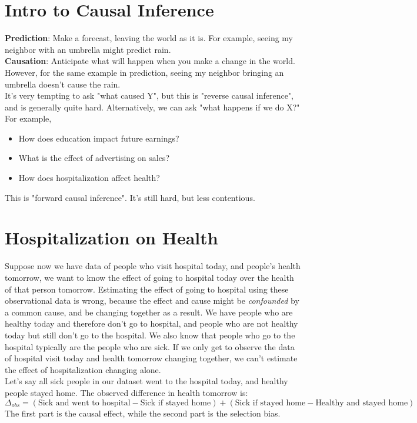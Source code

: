 

\section{Intro to Causal Inference}
\textbf{Prediction}: Make a forecast, leaving the world as it is. For example, seeing my neighbor with an umbrella might predict rain.\\
\textbf{Causation}: Anticipate what will happen when you make a change in the world. However, for the same example in prediction, seeing my neighbor bringing an umbrella doesn't cause the rain.\\
It's very tempting to ask "what caused Y", but this is "reverse causal inference", and is generally quite hard. Alternatively, we can ask "what happens if we do X?" For example, 
\begin{itemize}
\item How does education impact future earnings?
\item What is the effect of advertising on sales?
\item How does hospitalization affect health?
\end{itemize}
This is "forward causal inference". It's still hard, but less contentious.\\
\section{Hospitalization on Health}
Suppose now we have data of people who visit hospital today, and people's health tomorrow, we want to know the effect of going to hospital today over the health of that person tomorrow. Estimating the effect of going to hospital using these observational data is wrong, because the effect and cause might be \textit{confounded} by a common cause, and be changing together as a result. We have people who are healthy today and therefore don't go to hospital, and people who are not healthy today but still don't go to the hospital. We also know that people who go to the hospital typically are the people who are sick. If we only get to observe the data of hospital visit today and health tomorrow changing together, we can't estimate the effect of hospitalization changing alone.\\
Let's say all sick people in our dataset went to the hospital today, and healthy people stayed home. The observed difference in health tomorrow is:
\begin{equation}
\Delta_{obs} = (\textrm{Sick and went to hospital} - \textrm{Sick if stayed home}) + (\textrm{Sick if stayed home}-\textrm{Healthy and stayed home})
\end{equation}
The first part is the causal effect, while the second part is the selection bias.
